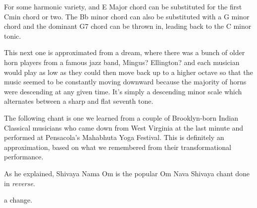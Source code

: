 \documentclass[a5paper,twoside,9pt]{extbook}
\newtheorem{I Surrender}{Definition}
\begin{document}
\begin{quote}
{%
\parindent 0pt
\noindent
\ifx\preLilyPondExample \undefined
\else
  \expandafter\preLilyPondExample
\fi
\def\lilypondbook{}%

\ifx\postLilyPondExample \undefined
\else
  \expandafter\postLilyPondExample
\fi
}
\end{quote}

For some harmonic variety, and E Major chord can be substituted for the first Cmin chord or two. The Bb minor chord can also be substituted with a G minor chord and the dominant G7 chord can be thrown in, leading back to the C minor tonic.

This next one is approximated from a dream, where there was a bunch of older horn players from a famous jazz band, Mingus? Ellington? and each musician would play as low as they could then move back up to a higher octave so that the music seemed to be constantly moving downward because the majority of horns were descending at any given time. It's simply a descending minor scale which alternates between a sharp and flat seventh tone.

\begin{quote}
{%
\parindent 0pt
\noindent
\ifx\preLilyPondExample \undefined
\else
  \expandafter\preLilyPondExample
\fi
\def\lilypondbook{}%

\ifx\postLilyPondExample \undefined
\else
  \expandafter\postLilyPondExample
\fi
}
\end{quote}

The following chant is one we learned from a couple of Brooklyn-born Indian Classical musicians who came down from West Virginia at the last minute and performed at Pensacola's Mahabhuta Yoga Festival. This is definitely an approximation, based on what we remembered from their transformational performance.

As he explained, Shivaya Nama Om is the popular Om Nava Shivaya chant done in \emph{reverse}. 

\begin{quote}
{%
\parindent 0pt
\noindent
\ifx\preLilyPondExample \undefined
\else
  \expandafter\preLilyPondExample
\fi
\def\lilypondbook{}%

\ifx\postLilyPondExample \undefined
\else
  \expandafter\postLilyPondExample
\fi
}
\end{quote}

a change.
\end{document}
